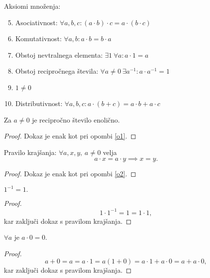 \documentclass[12pt, a4paper]{article}
\begin{document}
\begin{okvir}
\begin{definicija}
Aksiomi množenja:

\begin{enumerate}[label=A\arabic*:]
\setcounter{enumi}{4}
\item Asociativnost: $\forall a, b, c\colon(a\cdot b)\cdot c=a\cdot(b\cdot c)$
\item Komutativnost: $\forall a, b\colon a\cdot b=b\cdot a$
\item Obstoj nevtralnega elementa: $\exists 1~\forall a\colon a\cdot 1=a$
\item Obstoj recipročnega števila: $\forall a\ne 0~\exists a^{-1}\colon a\cdot a^{-1}=1$
\item $1\ne 0$
\item Distributivnost: $\forall a,b,c\colon a\cdot(b+c)=a\cdot b+a\cdot c$
\end{enumerate}
\end{definicija}
\end{okvir}

\begin{opomba}
Za $a\ne 0$ je recipročno število enolično.
\end{opomba}

\begin{proof}
Dokaz je enak kot pri opombi \ref{o1}.
\end{proof}

\begin{opomba}
Pravilo krajšanja: $\forall a,x,y,~a\ne 0$ velja
\[
a\cdot x=a\cdot y\implies x=y.
\]
\end{opomba}

\begin{proof}
Dokaz je enak kot pri opombi \ref{o2}.
\end{proof}

\begin{posledica}
$1^{-1}=1.$
\end{posledica}

\begin{proof}
\[
1\cdot 1^{-1}=1=1\cdot 1,
\]
kar zaključi dokaz s pravilom krajšanja.
\end{proof}

\begin{posledica}
$\forall a$ je $a\cdot 0=0$.
\end{posledica}

\begin{proof}
\[
a+0=a=a\cdot 1=a(1+0)=a\cdot 1+a\cdot 0=a+a\cdot 0,
\]
kar zaključi dokaz s pravilom krajšanja.
\end{proof}
\end{document}
